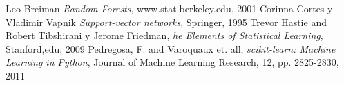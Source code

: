 \documentclass[a4paper,12pt]{article}
\begin{document}
\begin{thebibliography}{9}
   Leo Breiman  \textit{Random Forests},   www.stat.berkeley.edu, 2001
  Corinna Cortes y Vladimir Vapnik  \textit{Support-vector networks}, Springer, 1995
  Trevor Hastie and Robert Tibshirani y Jerome Friedman, \textit{he Elements of Statistical Learning}, Stanford,edu, 2009
  Pedregosa, F. and Varoquaux et. all, \textit{scikit-learn: Machine Learning in Python}, Journal of Machine Learning Research, 12, pp. 2825-2830, 2011
\end{thebibliography}
\end{document}
